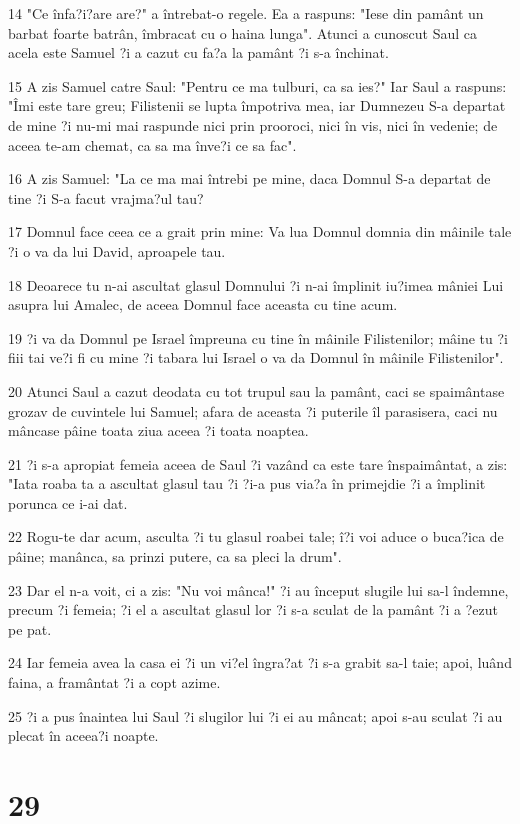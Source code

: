\par 14 "Ce înfa?i?are are?" a întrebat-o regele. Ea a raspuns: "Iese din pamânt un barbat foarte batrân, îmbracat cu o haina lunga". Atunci a cunoscut Saul ca acela este Samuel ?i a cazut cu fa?a la pamânt ?i s-a închinat.
\par 15 A zis Samuel catre Saul: "Pentru ce ma tulburi, ca sa ies?" Iar Saul a raspuns: "Îmi este tare greu; Filistenii se lupta împotriva mea, iar Dumnezeu S-a departat de mine ?i nu-mi mai raspunde nici prin prooroci, nici în vis, nici în vedenie; de aceea te-am chemat, ca sa ma înve?i ce sa fac".
\par 16 A zis Samuel: "La ce ma mai întrebi pe mine, daca Domnul S-a departat de tine ?i S-a facut vrajma?ul tau?
\par 17 Domnul face ceea ce a grait prin mine: Va lua Domnul domnia din mâinile tale ?i o va da lui David, aproapele tau.
\par 18 Deoarece tu n-ai ascultat glasul Domnului ?i n-ai împlinit iu?imea mâniei Lui asupra lui Amalec, de aceea Domnul face aceasta cu tine acum.
\par 19 ?i va da Domnul pe Israel împreuna cu tine în mâinile Filistenilor; mâine tu ?i fiii tai ve?i fi cu mine ?i tabara lui Israel o va da Domnul în mâinile Filistenilor".
\par 20 Atunci Saul a cazut deodata cu tot trupul sau la pamânt, caci se spaimântase grozav de cuvintele lui Samuel; afara de aceasta ?i puterile îl parasisera, caci nu mâncase pâine toata ziua aceea ?i toata noaptea.
\par 21 ?i s-a apropiat femeia aceea de Saul ?i vazând ca este tare înspaimântat, a zis: "Iata roaba ta a ascultat glasul tau ?i ?i-a pus via?a în primejdie ?i a împlinit porunca ce i-ai dat.
\par 22 Rogu-te dar acum, asculta ?i tu glasul roabei tale; î?i voi aduce o buca?ica de pâine; manânca, sa prinzi putere, ca sa pleci la drum".
\par 23 Dar el n-a voit, ci a zis: "Nu voi mânca!" ?i au început slugile lui sa-l îndemne, precum ?i femeia; ?i el a ascultat glasul lor ?i s-a sculat de la pamânt ?i a ?ezut pe pat.
\par 24 Iar femeia avea la casa ei ?i un vi?el îngra?at ?i s-a grabit sa-l taie; apoi, luând faina, a framântat ?i a copt azime.
\par 25 ?i a pus înaintea lui Saul ?i slugilor lui ?i ei au mâncat; apoi s-au sculat ?i au plecat în aceea?i noapte.

\chapter{29}

